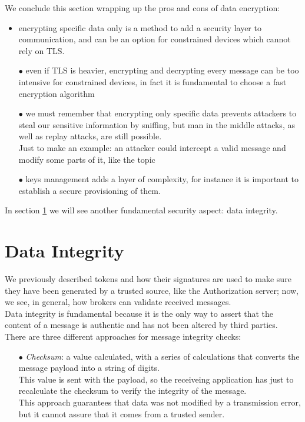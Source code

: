 \documentclass[12pt]{report}
\begin{document}
{{We conclude this section wrapping up the pros and cons of data encryption:

\begin{itemize}
\setlength{\itemindent}{+4mm}
\item encrypting specific data only is a method to add a security layer to communication, and can be an option for constrained devices which cannot rely on TLS.
\item[$\bullet$] even if TLS is heavier, encrypting and decrypting every message can be too intensive for constrained devices, in fact it is fundamental to choose a fast encryption algorithm
\item[$\bullet$] we must remember that encrypting only specific data prevents attackers to steal our sensitive information by sniffing, but man in the middle attacks, as well as replay attacks, are still possible.\\ 
Just to make an example: an attacker could intercept a valid message and modify some parts of it, like the topic
\item[$\bullet$] keys management adds a layer of complexity, for instance it is important to establish a secure provisioning of them.
\end{itemize}
\bigskip
In section \ref{sec:dataintegrity} we will see another fundamental security aspect: data integrity.\\

\clearpage
\section{Data Integrity}
\label{sec:dataintegrity}
\bigskip

We previously described tokens and how their signatures are used to make sure they have been generated by a trusted source, like the Authorization server; now, we see, in general, how brokers can validate received messages.\\
Data integrity is fundamental because it is the only way to assert that the content of a message is authentic and has not been altered by third parties.\\
There are three different approaches for message integrity checks:

\begin{itemize}
\setlength{\itemindent}{+4mm}
\item[$\bullet$] \emph{Checksum}: a value calculated, with a series of calculations that converts the message payload into a string of digits.\\
This value is sent with the payload, so the receiveing application has just to recalculate the checksum to verify the integrity of the message.\\
This approach guarantees that data was not modified by a transmission error, but it cannot assure that it comes from a trusted sender.


\end{itemize}}}
\end{document}
